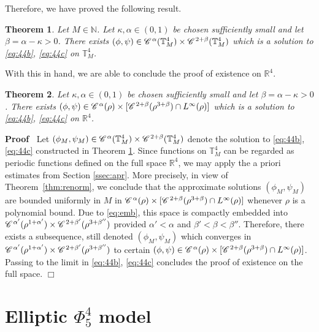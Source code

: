 \documentclass[a4paper,11pt]{article}
\newenvironment{proof}{\noindent\textbf{Proof\ }}{\hspace*{\fill}$\Box$\medskip}
\newtheorem{theorem}{Theorem}[section]
\numberwithin{equation}{section}
\newcommand{\CC}{\mathscr{C} \hspace{.1em}}
\newcommand{\R}{\mathbb{R}}
\newcommand{\8}{\infty}
\begin{document}
Therefore, we have proved the following result.

\begin{theorem}\label{thm:ex-44-per}
Let $M\in\mathbb{N}$. Let $\kappa, \alpha\in (0,1)$ be chosen sufficiently small and let $\beta=\alpha-\kappa>0$.  There exists $(\phi,\psi)\in \CC^{\alpha} (\mathbb{T}_{M}^{4})\times \CC^{2+\beta}(\mathbb{T}_{M}^{4})$ which is a solution to \eqref{eq:44b}, \eqref{eq:44c} on $\mathbb{T}_{M}^{4}$.
\end{theorem}

With this in hand, we are able to conclude the proof of existence on $\R^{4}$.

\begin{theorem}\label{thm:ex43}
Let $\kappa, \alpha\in (0,1)$ be chosen sufficiently small and let $\beta=\alpha-\kappa>0$. There exists $ (\phi,\psi)\in \CC^{\alpha}(\rho)\times[\CC^{2+\beta}(\rho^{3+\beta})\cap L^{\infty}(\rho)]$  which is a solution to \eqref{eq:44b}, \eqref{eq:44c} on $\R^{4}$.
\end{theorem}

\begin{proof}
Let  $(\phi_{M},\psi_{M})\in \CC^{\alpha}(\mathbb{T}^{4}_{M})\times\CC^{2+\beta}(\mathbb{T}^{4}_{M})$ denote the solution to \eqref{eq:44b}, \eqref{eq:44c}  constructed in Theorem \ref{thm:ex-44-per}.
Since functions on $\mathbb{T}^{4}_{M}$ can be regarded as periodic functions defined on the full space $\R^{4}$, we may apply the a priori estimates from Section \ref{ssec:apr}. More precisely, in view of Theorem~\ref{thm:renorm}, we conclude that the approximate solutions $(\phi_{M},\psi_{M})$ are bounded uniformly in $M$ in $ \CC^{\alpha}(\rho)\times[\CC^{2+\beta}(\rho^{3+\beta})\cap L^{\infty}(\rho)]$ whenever $\rho$ is a polynomial bound. Due to \eqref{eq:emb}, this space is compactly embedded into $\CC^{\alpha'}(\rho^{1+\alpha'})\times\CC^{2+\beta'}(\rho^{3+\beta''})$ provided $\alpha'<\alpha$ and $\beta'<\beta<\beta''$. Therefore, there exists a subsequence, still denoted $(\phi_{M},\psi_{M})$ which converges in $\CC^{\alpha'}(\rho^{1+\alpha'})\times\CC^{2+\beta'}(\rho^{3+\beta''})$ to certain $(\phi,\psi)\in  \CC^{\alpha}(\rho)\times[\CC^{2+\beta}(\rho^{3+\beta})\cap L^{\infty}(\rho)]$. Passing to the limit in  \eqref{eq:44b}, \eqref{eq:44c} concludes the proof of existence on the full space.
\end{proof}




\section{Elliptic $\Phi^4_5$ model}
\label{sec:45}
\end{document}
